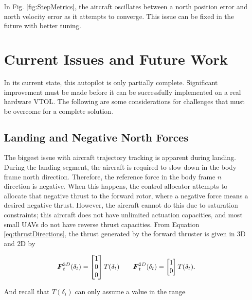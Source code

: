 In Fig. \ref{fig:StepMetrics}, the aircraft oscillates between a north position error and north velocity error as it attempts to converge. 
This issue can be fixed in the future with better tuning.

\section{Current Issues and Future Work}

In its current state, this autopilot is only partially complete.
Significant improvement must be made before it can be successfully implemented on a real hardware VTOL. 
The following are some considerations for challenges that must be overcome for a complete solution.

\subsection{Landing and Negative North Forces}

The biggest issue with aircraft trajectory tracking is apparent during landing. 
During the landing segment, the aircraft is required to slow down in the body frame north direction.
Therefore, the reference force in the body frame $n$ direction is negative.
When this happens, the control allocator attempts to allocate that negative thrust to the forward rotor, where a negative force means a desired negative thrust.
However, the aircraft cannot do this due to saturation constraints; this aircraft does not have unlimited actuation capacities, and most small UAVs do not have reverse thrust capacities.
From Equation \ref{eq:thrustDirections}, the thrust generated by the forward thruster is given in 3D and 2D by

\begin{align}
    \boldsymbol{F}^{3D}_t(\delta_t) = 
    \begin{bmatrix}
        1\\
        0\\
        0\\
    \end{bmatrix}
    \space T(\delta_t)
    \qquad
    \boldsymbol{F}^{2D}_t(\delta_t) = 
    \begin{bmatrix}
        1\\
        0\\
    \end{bmatrix}
    \space T(\delta_t).
\end{align}

And recall that $T(\delta_t)$ can only assume a value in the range

